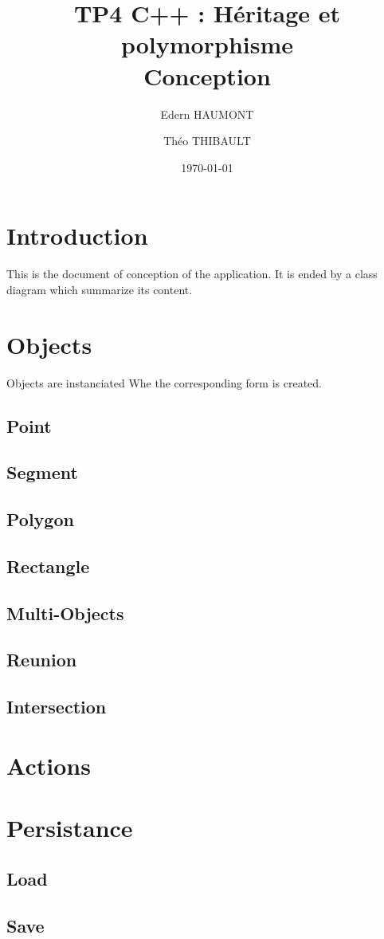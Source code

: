 \documentclass[a4paper, 12pts]{article}
\title{TP4 C++ : Héritage et polymorphisme \\
    \large Conception}
\author{Edern HAUMONT}
\author{Théo THIBAULT}
\affil{B3133}
\date{\today}
\begin{document}

\maketitle



\section{Introduction}
	This is the document of conception of the application. It is ended by a class diagram which summarize its content.

\section{Objects}
    Objects are instanciated Whe the corresponding form is created.
    \subsection{Point}
    \subsection{Segment}
    \subsection{Polygon}
    \subsection{Rectangle}
    \subsection{Multi-Objects}
    \subsection{Reunion}
    \subsection{Intersection}
\section{Actions}
\section{Persistance}
    \subsection{Load}
    \subsection{Save}
\end{document}
